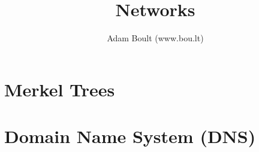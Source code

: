 \documentclass[oneside]{book}
\begin{document}
\author{Adam Boult (www.bou.lt)}
\title{Networks}
\maketitle

\setcounter{tocdepth}{0}
\tableofcontents



\part{Merkel Trees}


\part{Domain Name System (DNS)}
\end{document}
